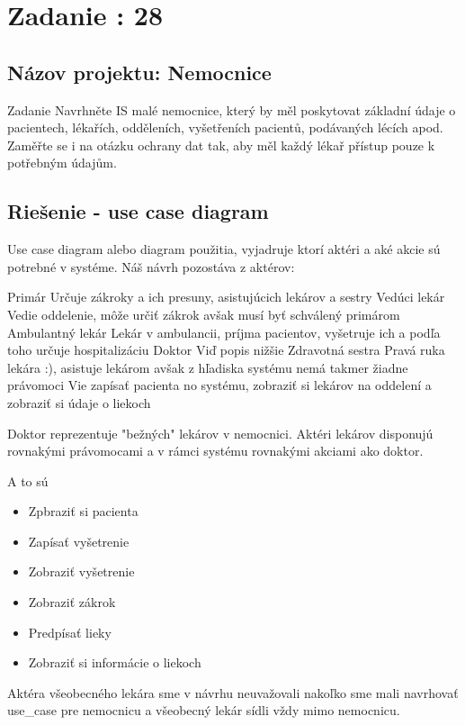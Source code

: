 \section{Zadanie : 28}

\subsection{Názov projektu: Nemocnice}

\large Zadanie
Navrhněte IS malé nemocnice, který by měl poskytovat základní údaje o pacientech, lékařích, odděleních, vyšetřeních
pacientů, podávaných lécích apod. Zaměřte se i na otázku ochrany dat tak, aby měl každý lékař přístup pouze k potřebným
údajům.

\subsection{Riešenie - use case diagram}
Use case diagram alebo diagram použitia, vyjadruje ktorí aktéri a aké akcie sú potrebné v systéme.
Náš návrh pozostáva z aktérov:
\begin{outline}
    \1 Primár
    \2 Určuje zákroky a ich presuny, asistujúcich lekárov a sestry
    \1 Vedúci lekár
    \2 Vedie oddelenie, môže určiť zákrok avšak musí byť schválený primárom
    \1 Ambulantný lekár
    \2 Lekár v ambulancii, príjma pacientov, vyšetruje ich a podľa toho určuje hospitalizáciu
    \1 Doktor
    \2 Viď popis nižšie
    \1 Zdravotná sestra
    \2 Pravá ruka lekára :), asistuje lekárom avšak z hľadiska systému nemá takmer žiadne právomoci
    \2 Vie zapísať pacienta no systému, zobraziť si lekárov na oddelení a zobraziť si údaje o liekoch
\end{outline}

Doktor reprezentuje "bežných"  lekárov v nemocnici.
Aktéri lekárov disponujú rovnakými právomocami a v rámci systému rovnakými akciami ako doktor.

A to sú
\begin{itemize}
    \item Zpbraziť si pacienta
    \item Zapísať vyšetrenie
    \item Zobraziť vyšetrenie
    \item Zobraziť zákrok
    \item Predpísať lieky
    \item Zobraziť si informácie o liekoch
\end{itemize}

Aktéra všeobecného lekára sme v návrhu neuvažovali nakoľko sme mali navrhovať use\_case pre nemocnicu a všeobecný lekár
sídli vždy mimo nemocnicu.


